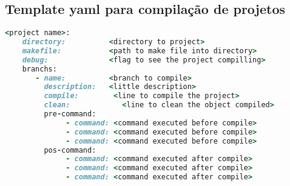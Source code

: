 \begin{apendicesenv}
\subsection{Template yaml para compilação de projetos}
\begin{lstlisting}[language=ruby, caption={Template para execução do Script de Recompilações},
                  label=template_para_script_recompilacoes]
    <project name>:
    directory:          <directory to project>
    makefile:           <path to make file into directory>
    debug:              <flag to see the project compilling>
    branchs:
       - name:          <branch to compile>
         description:   <little description>
         compile:        <line to compile the project>
         clean:            <line to clean the object compiled>
         pre-command:
              - command: <command executed before compile>
              - command: <command executed before compile>
              - command: <command executed before compile>
         pos-command:
              - command: <command executed after compile>
              - command: <command executed after compile>
              - command: <command executed after compile>
\end{lstlisting}

\end{apendicesenv}
